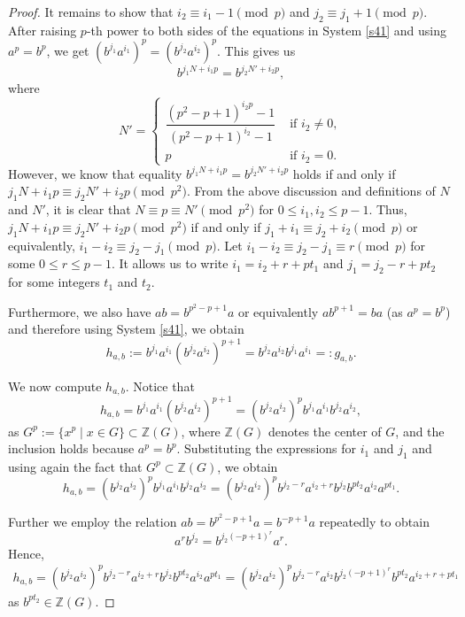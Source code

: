 \documentclass[10pt,a4paper]{amsart}
\begin{document}
\begin{proof}
It remains to show that $i_2\equiv i_1-1 \pmod  p$ and $j_2 \equiv j_1+1 \pmod  p$. After raising $p$-th power to both sides of the equations in System \eqref{s41} and using $a^p=b^p$, we get $(b^{j_1}a^{i_1})^p=(b^{j_2}a^{i_2})^p$. This gives us  
\[
b^{j_1N+i_1p}=b^{j_2N'+i_2p},
\]
where $$
N'=\begin{cases} \dfrac{(p^2-p+1)^{i_2p}-1}{(p^2-p+1)^{i_2}-1} & \text{ if } i_2 \neq 0,\\p 
 & \text{ if } i_2=0.\end{cases}$$
  However, we know that equality $b^{j_1N+i_1p}=b^{j_2N'+i_2p}$ holds if and only if  $j_1N+i_1p \equiv j_2N'+i_2p \pmod {p^2}$.
 From the above discussion and definitions of $N$ and $N'$, it is clear that $N \equiv p \equiv N' \pmod {p^2}$ for $0 \leq i_1,i_2 \leq p-1$. Thus,  $j_1N+i_1p \equiv j_2N'+i_2p \pmod {p^2}$ if and only if $j_1+i_1 \equiv j_2+i_2 \pmod p$ or equivalently, $i_1-i_2 \equiv j_2-j_1 \pmod p$. Let $i_1-i_2 \equiv j_2-j_1 \equiv r \pmod p$ for some $0 \leq r \leq p-1$. It allows us to write $i_1=i_2+r+pt_1$ and $j_1=j_2-r+pt_2$ for some integers $t_1$ and $t_2$.
 
 Furthermore, we also have $ab=b^{p^2-p+1}a$ or equivalently $ab^{p+1}=ba$ (as $a^p=b^p$) and therefore using System \eqref{s41}, we obtain    
 \begin{equation}\label{e43}
 h_{a,b}:=b^{j_1}a^{i_1}(b^{j_2}a^{i_2})^{p+1}=b^{j_2}a^{i_2}b^{j_1}a^{i_1}=:g_{a,b}.
 \end{equation}

We now compute $h_{a,b}$.
Notice that 
\[
h_{a,b} = b^{j_1}a^{i_1}(b^{j_2}a^{i_2})^{p+1} 
= (b^{j_2}a^{i_2})^{p} b^{j_1}a^{i_1}b^{j_2}a^{i_2},
\]
as $G^{p} := \{x^{p} \mid x \in G\} \subset \mathbb{Z}(G)$,
where $ \mathbb{Z}(G) $ denotes the center of $ G $, 
and the inclusion holds because $a^{p} = b^{p}$. Substituting the expressions for $ i_1$ and $ j_1 $ and using again the fact that $G^{p} \subset \mathbb{Z}(G) $, we obtain  
\[
h_{a,b}=(b^{j_2}a^{i_2})^{p} b^{j_1}a^{i_1}b^{j_2}a^{i_2}
= (b^{j_2}a^{i_2})^{p}b^{j_2-r}a^{i_2+r}b^{j_2}b^{pt_2}a^{i_2}a^{pt_1}.
\]

Further we employ the relation $ab=b^{p^2-p+1}a=b^{-p+1}a$ repeatedly to obtain $$a^rb^{j_2}=b^{j_2(-p+1)^{r}}a^r.$$Hence, 
\begin{equation*}
\begin{split}
h_{a,b}= (b^{j_2}a^{i_2})^{p}b^{j_2-r}a^{i_2+r}b^{j_2}b^{pt_2}a^{i_2}a^{pt_1}={(b^{j_2}a^{i_2})^{p}b^{j_2-r}a^{i_2}b^{j_2(-p+1)^{r}}b^{pt_2}a^{i_2+r+pt_1}}
\end{split}
\end{equation*}
as $b^{pt_2}\in \mathbb{Z}(G)$.


\end{proof}
\end{document}

